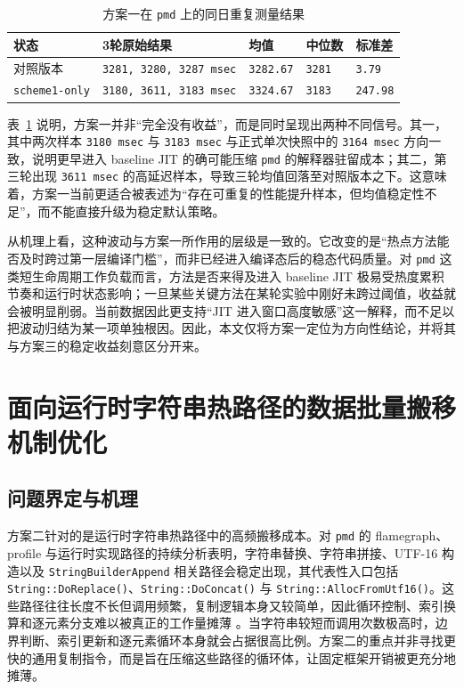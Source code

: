 \begin{table}[htbp]
    \centering
    \small
    \caption{方案一在 \texttt{pmd} 上的同日重复测量结果}
    \label{tab:scheme1-stability}
    \begin{tabular}{>{\raggedright\arraybackslash}p{2.3cm}>{\raggedright\arraybackslash}p{3.6cm}>{\raggedright\arraybackslash}p{1.7cm}>{\raggedright\arraybackslash}p{1.6cm}>{\raggedright\arraybackslash}p{1.6cm}}
        \hline
        \textbf{状态} & \textbf{3轮原始结果} & \textbf{均值} & \textbf{中位数} & \textbf{标准差} \\
        \hline
        对照版本 & \texttt{3281, 3280, 3287\,msec} & \texttt{3282.67} & \texttt{3281} & \texttt{3.79} \\
        \texttt{scheme1-only} & \texttt{3180, 3611, 3183\,msec} & \texttt{3324.67} & \texttt{3183} & \texttt{247.98} \\
        \hline
    \end{tabular}
\end{table}

表~\ref{tab:scheme1-stability} 说明，方案一并非“完全没有收益”，而是同时呈现出两种不同信号。其一，其中两次样本 \texttt{3180\,msec} 与 \texttt{3183\,msec} 与正式单次快照中的 \texttt{3164\,msec} 方向一致，说明更早进入 baseline JIT 的确可能压缩 \texttt{pmd} 的解释器驻留成本；其二，第三轮出现 \texttt{3611\,msec} 的高延迟样本，导致三轮均值回落至对照版本之下。这意味着，方案一当前更适合被表述为“存在可重复的性能提升样本，但均值稳定性不足”，而不能直接升级为稳定默认策略。

从机理上看，这种波动与方案一所作用的层级是一致的。它改变的是“热点方法能否及时跨过第一层编译门槛”，而非已经进入编译态后的稳态代码质量。对 \texttt{pmd} 这类短生命周期工作负载而言，方法是否来得及进入 baseline JIT 极易受热度累积节奏和运行时状态影响；一旦某些关键方法在某轮实验中刚好未跨过阈值，收益就会被明显削弱。当前数据因此更支持“JIT 进入窗口高度敏感”这一解释，而不足以把波动归结为某一项单独根因。因此，本文仅将方案一定位为方向性结论，并将其与方案三的稳定收益刻意区分开来。

\section{面向运行时字符串热路径的数据批量搬移机制优化}

\subsection{问题界定与机理}

方案二针对的是运行时字符串热路径中的高频搬移成本。对 \texttt{pmd} 的 flamegraph、profile 与运行时实现路径的持续分析表明，字符串替换、字符串拼接、UTF-16 构造以及 \texttt{StringBuilderAppend} 相关路径会稳定出现，其代表性入口包括 \texttt{String::DoReplace()}、\texttt{String::DoConcat()} 与 \texttt{String::AllocFromUtf16()}。这些路径往往长度不长但调用频繁，复制逻辑本身又较简单，因此循环控制、索引换算和逐元素分支难以被真正的工作量摊薄 \citep{Haubl2008OptimizedStrings,Haubl2010CompactStrings}。当字符串较短而调用次数极高时，边界判断、索引更新和逐元素循环本身就会占据很高比例。方案二的重点并非寻找更快的通用复制指令，而是旨在压缩这些路径的循环体，让固定框架开销被更充分地摊薄。

